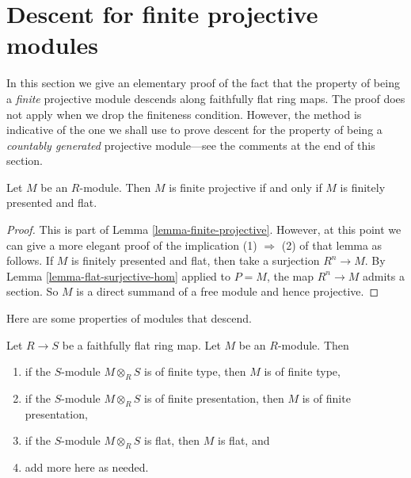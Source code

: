 \section{Descent for finite projective modules}
\label{section-finite-projective}

\noindent
In this section we give an elementary proof of the fact that the property of
being a {\it finite} projective module descends along faithfully flat ring
maps.  The proof does not apply when we drop the finiteness condition.
However, the method is indicative of the one we shall use to prove descent
for the property of being a {\it countably generated} projective module---see
the comments at the end of this section.

\begin{lemma}
\label{lemma-finite-projective-again}
Let $M$ be an $R$-module.  Then $M$ is finite projective if and only if $M$ is
finitely presented and flat.
\end{lemma}

\begin{proof}
This is part of
Lemma \ref{lemma-finite-projective}.
However, at this point we can give a more elegant proof of the implication
(1) $\Rightarrow$ (2) of that lemma as follows.
If $M$ is finitely presented and flat, then take a surjection
$R^n \to M$.  By
Lemma \ref{lemma-flat-surjective-hom}
applied to $P = M$, the map $R^n \to M$ admits a section.
So $M$ is a direct summand of a  free module and hence projective.
\end{proof}

\noindent
Here are some properties of modules that descend.

\begin{lemma}
\label{lemma-descend-properties-modules}
Let $R \to S$ be a faithfully flat ring map.
Let $M$ be an $R$-module. Then
\begin{enumerate}
\item if the $S$-module $M \otimes_R S$ is of finite type, then
$M$ is of finite type,
\item if the $S$-module $M \otimes_R S$ is of finite presentation, then
$M$ is of finite presentation,
\item if the $S$-module $M \otimes_R S$ is flat, then
$M$ is flat, and
\item add more here as needed.
\end{enumerate}
\end{lemma}

